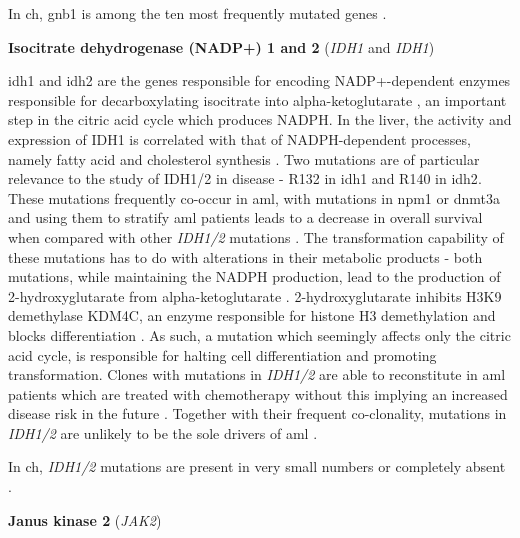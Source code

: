 In \ac{ch}, \ac{gnb1} is among the ten most frequently mutated genes \cite{Jaiswal2014-rl}.

\noindent \textbf{Isocitrate dehydrogenase (NADP+) 1 and 2} (\textit{IDH1} and \textit{IDH1})

\Ac{idh1} and \ac{idh2} are the genes responsible for encoding NADP+-dependent enzymes responsible for decarboxylating isocitrate into alpha-ketoglutarate \cite{Nekrutenko1998-ld}, an important step in the citric acid cycle which produces NADPH. In the liver, the activity and expression of IDH1 is correlated with that of NADPH-dependent processes, namely fatty acid and cholesterol synthesis \cite{Shechter2003-vd}. Two mutations are of particular relevance to the study of IDH1/2 in disease - R132 in \ac{idh1} and R140 in \ac{idh2}. These mutations frequently co-occur in \ac{aml}, with mutations in \ac{npm1} or \ac{dnmt3a} and using them to stratify \ac{aml} patients leads to a decrease in overall survival when compared with other \textit{IDH1/2} mutations \cite{Meggendorfer2018-me,Mardis2009-gl}. The transformation capability of these mutations has to do with alterations in their metabolic products - both mutations, while maintaining the NADPH production, lead to the production of 2-hydroxyglutarate from alpha-ketoglutarate \cite{Ward2010-fi}. 2-hydroxyglutarate inhibits H3K9 demethylase KDM4C, an enzyme responsible for histone H3 demethylation and blocks differentiation \cite{Lu2012-ix}. As such, a mutation which seemingly affects only the citric acid cycle, is responsible for halting cell differentiation and promoting transformation. Clones with mutations in \textit{IDH1/2} are able to reconstitute in \ac{aml} patients which are treated with chemotherapy without this implying an increased disease risk in the future \cite{Wiseman2016-kw}. Together with their frequent co-clonality, mutations in \textit{IDH1/2} are unlikely to be the sole drivers of \ac{aml} \cite{Hasserjian2020-qj}.

In \ac{ch}, \textit{IDH1/2} mutations are present in very small numbers or completely absent \cite{Jaiswal2014-rl,Genovese2014-eu,Xie2014-np}. 

\noindent \textbf{Janus kinase 2} (\textit{JAK2})

